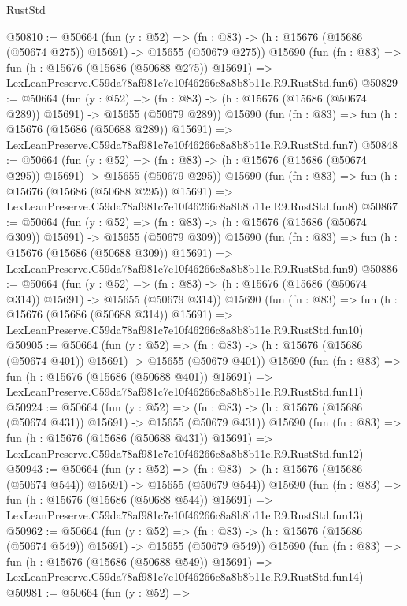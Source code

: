 \begin{lexlean}{RustStd}
\begin{coremodule}
@50810 := @50664
    (fun (y : @52) =>
    (fn : @83) -> (h : @15676 (@15686 (@50674 @275)) @15691) -> @15655 (@50679 @275))
    @15690
    (fun (fn : @83) =>
    fun (h : @15676 (@15686 (@50688 @275)) @15691) =>
    LexLeanPreserve.C59da78af981c7e10f46266c8a8b8b11e.R9.RustStd.fun6)
@50829 := @50664
    (fun (y : @52) =>
    (fn : @83) -> (h : @15676 (@15686 (@50674 @289)) @15691) -> @15655 (@50679 @289))
    @15690
    (fun (fn : @83) =>
    fun (h : @15676 (@15686 (@50688 @289)) @15691) =>
    LexLeanPreserve.C59da78af981c7e10f46266c8a8b8b11e.R9.RustStd.fun7)
@50848 := @50664
    (fun (y : @52) =>
    (fn : @83) -> (h : @15676 (@15686 (@50674 @295)) @15691) -> @15655 (@50679 @295))
    @15690
    (fun (fn : @83) =>
    fun (h : @15676 (@15686 (@50688 @295)) @15691) =>
    LexLeanPreserve.C59da78af981c7e10f46266c8a8b8b11e.R9.RustStd.fun8)
@50867 := @50664
    (fun (y : @52) =>
    (fn : @83) -> (h : @15676 (@15686 (@50674 @309)) @15691) -> @15655 (@50679 @309))
    @15690
    (fun (fn : @83) =>
    fun (h : @15676 (@15686 (@50688 @309)) @15691) =>
    LexLeanPreserve.C59da78af981c7e10f46266c8a8b8b11e.R9.RustStd.fun9)
@50886 := @50664
    (fun (y : @52) =>
    (fn : @83) -> (h : @15676 (@15686 (@50674 @314)) @15691) -> @15655 (@50679 @314))
    @15690
    (fun (fn : @83) =>
    fun (h : @15676 (@15686 (@50688 @314)) @15691) =>
    LexLeanPreserve.C59da78af981c7e10f46266c8a8b8b11e.R9.RustStd.fun10)
@50905 := @50664
    (fun (y : @52) =>
    (fn : @83) -> (h : @15676 (@15686 (@50674 @401)) @15691) -> @15655 (@50679 @401))
    @15690
    (fun (fn : @83) =>
    fun (h : @15676 (@15686 (@50688 @401)) @15691) =>
    LexLeanPreserve.C59da78af981c7e10f46266c8a8b8b11e.R9.RustStd.fun11)
@50924 := @50664
    (fun (y : @52) =>
    (fn : @83) -> (h : @15676 (@15686 (@50674 @431)) @15691) -> @15655 (@50679 @431))
    @15690
    (fun (fn : @83) =>
    fun (h : @15676 (@15686 (@50688 @431)) @15691) =>
    LexLeanPreserve.C59da78af981c7e10f46266c8a8b8b11e.R9.RustStd.fun12)
@50943 := @50664
    (fun (y : @52) =>
    (fn : @83) -> (h : @15676 (@15686 (@50674 @544)) @15691) -> @15655 (@50679 @544))
    @15690
    (fun (fn : @83) =>
    fun (h : @15676 (@15686 (@50688 @544)) @15691) =>
    LexLeanPreserve.C59da78af981c7e10f46266c8a8b8b11e.R9.RustStd.fun13)
@50962 := @50664
    (fun (y : @52) =>
    (fn : @83) -> (h : @15676 (@15686 (@50674 @549)) @15691) -> @15655 (@50679 @549))
    @15690
    (fun (fn : @83) =>
    fun (h : @15676 (@15686 (@50688 @549)) @15691) =>
    LexLeanPreserve.C59da78af981c7e10f46266c8a8b8b11e.R9.RustStd.fun14)
@50981 := @50664
    (fun (y : @52) =>

\end{coremodule}
\end{lexlean}
